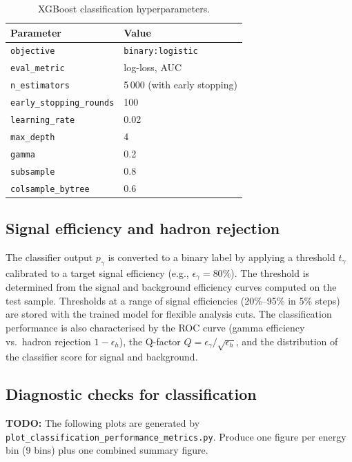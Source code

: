 \documentclass[12pt]{article}
\newcommand{\todo}[1]{\begin{hintBox} \textbf{TODO:} #1 \end{hintBox}}
\begin{document}
\begin{table}[h]
\centering
\caption{XGBoost classification hyperparameters.}
\label{tab:hyperparameters_cls}
\begin{tabular}{ll}
\toprule
\textbf{Parameter} & \textbf{Value} \\
\midrule
\texttt{objective}           & \texttt{binary:logistic} \\
\texttt{eval\_metric}        & log-loss, AUC \\
\texttt{n\_estimators}       & 5\,000 (with early stopping) \\
\texttt{early\_stopping\_rounds} & 100 \\
\texttt{learning\_rate}      & 0.02 \\
\texttt{max\_depth}          & 4 \\
\texttt{gamma}               & 0.2 \\
\texttt{subsample}           & 0.8 \\
\texttt{colsample\_bytree}   & 0.6 \\
\bottomrule
\end{tabular}
\end{table}

\subsection{Signal efficiency and hadron rejection}

The classifier output $p_\gamma$ is converted to a binary label by applying a
threshold $t_\gamma$ calibrated to a target signal efficiency
(e.g., $\epsilon_\gamma = 80\%$).
The threshold is determined from the signal and background efficiency curves
computed on the test sample.
Thresholds at a range of signal efficiencies (20\%--95\% in 5\% steps) are
stored with the trained model for flexible analysis cuts.
The classification performance is also characterised by the ROC curve
(gamma efficiency vs.\ hadron rejection $1 - \epsilon_h$),
the Q-factor $Q = \epsilon_\gamma / \sqrt{\epsilon_h}$,
and the distribution of the classifier score for signal and background.

\subsection{Diagnostic checks for classification}

\todo{The following plots are generated by \texttt{plot\_classification\_performance\_metrics.py}. Produce one figure per energy bin (9 bins) plus one combined summary figure.}
\end{document}
